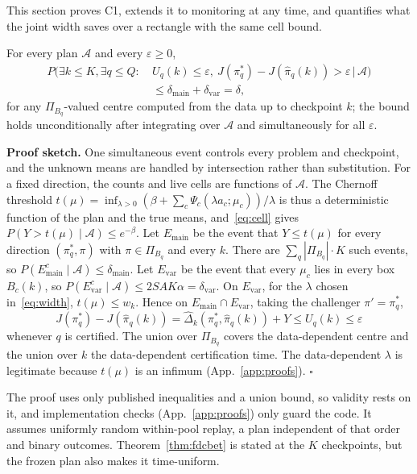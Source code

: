 \documentclass[sigconf,anonymous,review]{acmart}
\newcommand{\cA}{\mathcal{A}}
\newcommand{\eps}{\varepsilon}
\newcommand{\dmain}{\delta_{\text{main}}}
\newcommand{\dvar}{\delta_{\text{var}}}
\begin{document}
This section proves C1, extends it to monitoring at any time, and quantifies what the joint width saves over a rectangle with the same cell bound.

\begin{theorem}\label{thm:fdcbet}
For every plan $\cA$ and every $\eps \ge 0$,
\[
\begin{aligned}
P\big(\exists k \le K, \exists q \le Q:\ & U_q(k) \le \eps,\ J(\pi^*_q) - J(\hat\pi_q(k)) > \eps \,\big|\, \cA\big)\\
&\le \dmain + \dvar = \delta,
\end{aligned}
\]
for any $\Pi_{B_q}$-valued centre computed from the data up to checkpoint $k$; the bound holds unconditionally after integrating over $\cA$ and simultaneously for all $\eps$.
\end{theorem}

\textbf{Proof sketch.} One simultaneous event controls every problem and checkpoint, and the unknown means are handled by intersection rather than substitution. For a fixed direction, the counts and live cells are functions of $\cA$. The Chernoff threshold $t(\mu) = \inf_{\lambda>0}(\beta + \sum_c \Psi_c(\lambda a_c;\mu_c))/\lambda$ is thus a deterministic function of the plan and the true means, and~\eqref{eq:cell} gives $P(Y > t(\mu) \mid \cA) \le e^{-\beta}$. Let $E_{\text{main}}$ be the event that $Y \le t(\mu)$ for every direction $(\pi^*_q, \pi)$ with $\pi \in \Pi_{B_q}$ and every $k$. There are $\sum_q|\Pi_{B_q}|\cdot K$ such events, so $P(E_{\text{main}}^c \mid \cA) \le \dmain$. Let $E_{\text{var}}$ be the event that every $\mu_c$ lies in every box $B_c(k)$, so $P(E_{\text{var}}^c \mid \cA) \le 2SAK\alpha = \dvar$. On $E_{\text{var}}$, for the $\lambda$ chosen in~\eqref{eq:width}, $t(\mu) \le w_k$. Hence on $E_{\text{main}} \cap E_{\text{var}}$, taking the challenger $\pi' = \pi^*_q$,
\[
J(\pi^*_q) - J(\hat\pi_q(k)) = \hat\Delta_k(\pi^*_q, \hat\pi_q(k)) + Y \le U_q(k) \le \eps
\]
whenever $q$ is certified. The union over $\Pi_{B_q}$ covers the data-dependent centre and the union over $k$ the data-dependent certification time. The data-dependent $\lambda$ is legitimate because $t(\mu)$ is an infimum (App.~\ref{app:proofs}). $\square$

The proof uses only published inequalities and a union bound, so validity rests on it, and implementation checks (App.~\ref{app:proofs}) only guard the code. It assumes uniformly random within-pool replay, a plan independent of that order and binary outcomes. Theorem~\ref{thm:fdcbet} is stated at the $K$ checkpoints, but the frozen plan also makes it time-uniform.
\end{document}
